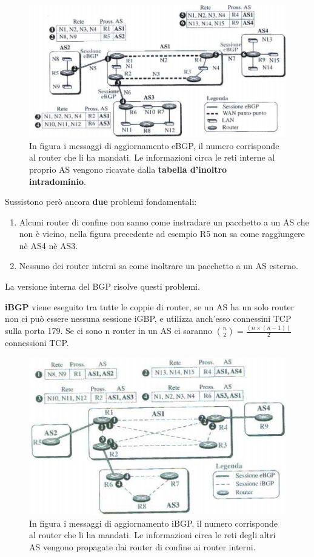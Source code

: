 \documentclass[11pt,a4paper,oneside]{book}
\theoremstyle{definition}
\begin{document}
\begin{figure}[!h]
	\centering
	\includegraphics[scale=0.35]{Immagini/eBGP.png}
	\caption{In figura i messaggi di aggiornamento eBGP, il numero corrisponde al router che li ha mandati. Le informazioni circa le reti interne al proprio AS vengono ricavate dalla \textbf{tabella d'inoltro intradominio}.}
\end{figure}

\pagebreak

Sussistono però ancora \textbf{due} problemi fondamentali:

\begin{enumerate}
	\item Alcuni router di confine non sanno come instradare un pacchetto a un AS che non è vicino, nella figura precedente ad esempio R5 non sa come raggiungere nè AS4 nè AS3.
	\item Nessuno dei router interni sa come inoltrare un pacchetto a un AS esterno.
\end{enumerate}

La versione interna del BGP risolve questi problemi.

\textbf{iBGP} viene eseguito tra tutte le coppie di router, se un AS ha un solo router non ci può essere nessuna sessione iGBP, e utilizza anch'esso connessini TCP sulla porta 179. Se ci sono n router in un AS ci saranno  $ \binom{n}{2} = \frac{(n \times (n - 1))}{2}$ connessioni TCP.

\begin{figure}[!h]
	\centering
	\includegraphics[scale=0.4]{Immagini/iBGP.png}
	\caption{In figura i messaggi di aggiornamento iBGP, il numero corrisponde al router che li ha mandati. Le informazioni circa le reti degli altri AS vengono propagate dai router di confine ai router interni.}
\end{figure}
\end{document}
